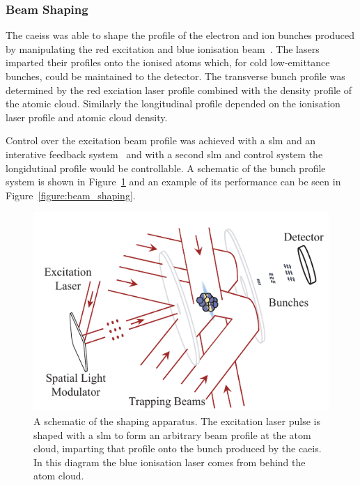 \subsubsection{Beam Shaping}

The \glspl{caeis} was able to shape the profile of the electron and ion bunches produced by manipulating the red excitation and blue ionisation beam~\cite{mcculloch_arbitrarily_2011}.
The lasers imparted their profiles onto the ionised atoms which, for cold low-emittance bunches, could be maintained to the detector.
The transverse bunch profile was determined by the red exciation laser profile combined with the density profile of the atomic cloud.
Similarly the longitudinal profile depended on the ionisation laser profile and atomic cloud density.

Control over the excitation beam profile was achieved with a \gls{slm} and an interative feedback system~\cite{van_bijnen_patterned_2015} and with a second \gls{slm} and control system the longidutinal profile would be controllable.
A schematic of the bunch profile system is shown in Figure~\ref{figure:beam_shaping_schematic} and an example of its performance can be seen in Figure~\ref{figure:beam_shaping}.

\begin{figure}
    \center
    \includegraphics{part2/Figs/beam_shaping_schem.pdf}
    \caption{A schematic of the shaping apparatus. The excitation laser pulse is shaped with a \gls{slm} to form an arbitrary beam profile at the atom cloud, imparting that profile onto the bunch produced by the \gls{caeis}. In this diagram the blue ionisation laser comes from behind the atom cloud.}
    \label{figure:beam_shaping_schematic}
\end{figure}

